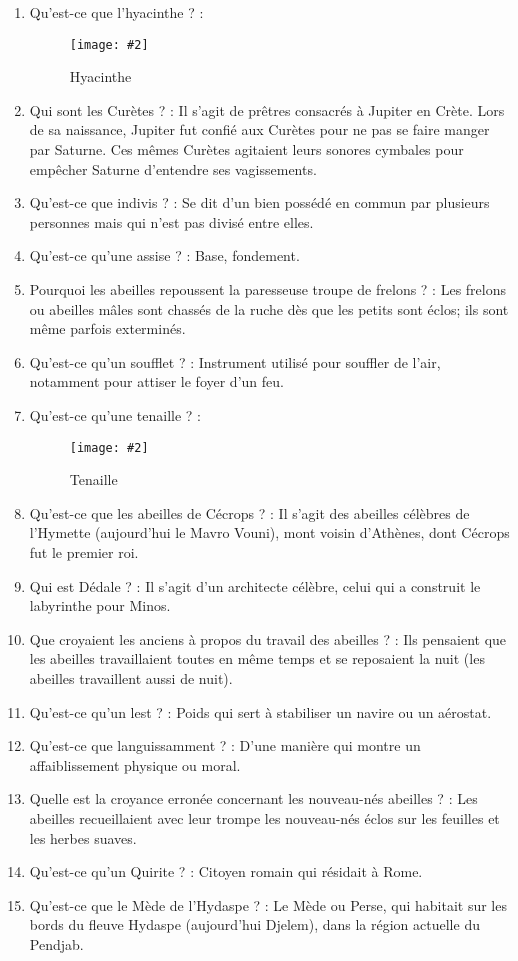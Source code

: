 \documentclass[a4paper, 11pt, hidelinks]{article}
\newcommand{\img}[4]{\begin{figure}[!ht]
    \centering
    \texttt{[image: \#2]}
    \caption{#3}
    \label{#4}
    \end{figure} }
\begin{document}
\begin{enumerate}
            \img{0.2}{Verveine.jpg}{Verveines}{140}
      \item Qu'est-ce que l'hyacinthe ? :
            \img{0.2}{Hyacinthe.jpg}{Hyacinthe}{141}
      \item Qui sont les Curètes ? : Il s'agit de prêtres consacrés à Jupiter en Crète. Lors de sa naissance, Jupiter fut confié aux Curètes pour ne pas se faire manger par Saturne.
            Ces mêmes Curètes agitaient leurs sonores cymbales pour empêcher Saturne d'entendre ses vagissements.
      \item Qu'est-ce que indivis ? : Se dit d'un bien possédé en commun par plusieurs personnes mais qui n'est pas divisé entre elles.
      \item Qu'est-ce qu'une assise ? : Base, fondement.
      \item Pourquoi les abeilles repoussent la paresseuse troupe de frelons ? : Les frelons ou abeilles mâles sont chassés de la ruche dès que les petits sont éclos; ils sont même parfois exterminés.
      \item Qu'est-ce qu'un soufflet ? : Instrument utilisé pour souffler de l'air, notamment pour attiser le foyer d'un feu.
      \item Qu'est-ce qu'une tenaille ? : 
            \img{0.3}{Tenaille.jpg}{Tenaille}{142}
      \item Qu'est-ce que les abeilles de Cécrops ? : Il s'agit des abeilles célèbres de l'Hymette (aujourd'hui le Mavro Vouni), mont voisin d'Athènes, dont Cécrops fut le premier roi.
      \item Qui est Dédale ? : Il s'agit d'un architecte célèbre, celui qui a construit le labyrinthe pour Minos.
      \item Que croyaient les anciens à propos du travail des abeilles ? : Ils pensaient que les abeilles travaillaient toutes en même temps et se reposaient la nuit (les abeilles travaillent aussi de nuit).
      \item Qu'est-ce qu'un lest ? : Poids qui sert à stabiliser un navire ou un aérostat.
      \item Qu'est-ce que languissamment ? : D'une manière qui montre un affaiblissement physique ou moral.
      \item Quelle est la croyance erronée concernant les nouveau-nés abeilles ? : Les abeilles recueillaient avec leur trompe les nouveau-nés éclos sur les feuilles et les herbes suaves.
      \item Qu'est-ce qu'un Quirite ? : Citoyen romain qui résidait à Rome.
      \item Qu'est-ce que le Mède de l'Hydaspe ? : Le Mède ou Perse, qui habitait sur les bords du fleuve Hydaspe (aujourd'hui Djelem), dans la région actuelle du Pendjab.

\end{enumerate}
\end{document}
